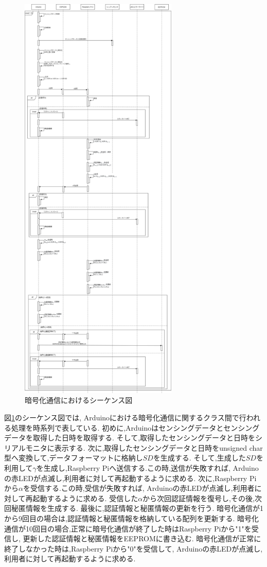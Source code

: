 \begin{figure}[H]
\begin{center}
	\includegraphics[height=200mm]{ango_sequence.png}
	\caption{暗号化通信におけるシーケンス図}
	\label{fig:ango_sequence}
\end{center}
\end{figure}

図\ref{fig:ango_sequence}のシーケンス図では,
Arduinoにおける暗号化通信に関するクラス間で行われる処理を時系列で表している.
初めに,Arduinoはセンシングデータとセンシングデータを取得した日時を取得する.
そして,取得したセンシングデータと日時をシリアルモニタに表示する.
次に,取得したセンシングデータと日時をunsigned char型へ変換して,データフォーマットに格納し$SD$を生成する.
そして,生成した$SD$を利用して$\gamma$を生成し,Raspberry Piへ送信する.この時,送信が失敗すれば,
Arduinoの赤LEDが点滅し,利用者に対して再起動するように求める.
次に,Raspberry Piから$\alpha$を受信する.この時,受信が失敗すれば,
Arduinoの赤LEDが点滅し,利用者に対して再起動するように求める.
受信した$\alpha$から次回認証情報を復号し,その後,次回秘匿情報を生成する.
最後に,認証情報と秘匿情報の更新を行う.
暗号化通信が1から9回目の場合は,認証情報と秘匿情報を格納している配列を更新する.
暗号化通信が10回目の場合,正常に暗号化通信が終了した時はRaspberry Piから"1"を受信し,
更新した認証情報と秘匿情報をEEPROMに書き込む.
暗号化通信が正常に終了しなかった時は,Raspberry Piから"0"を受信して,
Arduinoの赤LEDが点滅し,利用者に対して再起動するように求める.

